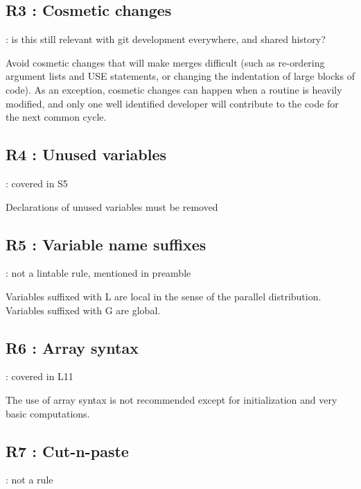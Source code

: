 \documentclass[letterpaper,10pt,english]{sphinxmanual}
\begin{document}
\subsection{R3 : Cosmetic changes}
\label{\detokenize{obsolescent/r3:r3-cosmetic-changes}}\label{\detokenize{obsolescent/r3::doc}}
 : is this still relevant with git development everywhere, and shared history?

Avoid cosmetic changes that will make merges difficult (such as re-ordering argument lists and
USE statements, or changing the indentation of large blocks of code).
As an exception, cosmetic changes can happen when a routine is heavily modified, and only one
well identified developer will contribute to the code for the next common cycle.


\subsection{R4 :  Unused variables}
\label{\detokenize{obsolescent/r4:r4-unused-variables}}\label{\detokenize{obsolescent/r4::doc}}
 : covered in S5

Declarations of unused variables must be removed


\subsection{R5 :  Variable name suffixes}
\label{\detokenize{obsolescent/r5:r5-variable-name-suffixes}}\label{\detokenize{obsolescent/r5::doc}}
 : not a lintable rule, mentioned in preamble

Variables suffixed with L are local in the sense of the parallel distribution.
Variables suffixed with G are global.


\subsection{R6 :  Array syntax}
\label{\detokenize{obsolescent/r6:r6-array-syntax}}\label{\detokenize{obsolescent/r6::doc}}
 : covered in L11

The use of array syntax is not recommended except for initialization and very basic computations.


\subsection{R7 :  Cut-n-paste}
\label{\detokenize{obsolescent/r7:r7-cut-n-paste}}\label{\detokenize{obsolescent/r7::doc}}
 : not a rule
\end{document}
